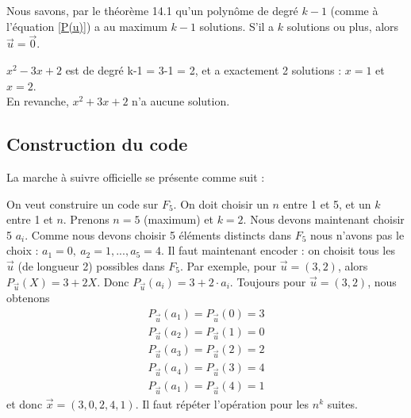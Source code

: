 \documentclass[11pt,a4paper]{article}
\renewcommand{\)}{\right)}
\renewcommand{\(}{\left(}
\begin{document}
Nous savons, par le théorème 14.1 qu'un polynôme de degré $k-1$ (comme à l'équation \eqref{P(u)}) a au maximum $k-1$ solutions. S'il a $k$ solutions ou plus, alors $\vec{u} = \vec{0}$.
\begin{exemple}
	$x^2 - 3x + 2$ est de degré k-1 = 3-1 = 2, et a exactement 2 solutions : $x= 1$ et $x=2$.\\
	En revanche, $x^2 + 3x + 2$ n'a aucune solution.
\end{exemple}


\subsection{Construction du code}
La marche à suivre officielle se présente comme suit :\\
\begin{exemple}
	 On veut construire un code sur $F_5$. On doit choisir un $n$ entre 1 et 5, et un $k$ entre 1 et $n$. Prenons $n=5$ (maximum) et $k = 2$. Nous devons maintenant choisir 5 $a_i$. Comme nous devons choisir 5 éléments distincts dans $F_5$ nous n'avons pas le choix : $a_1 = 0,\ a_2 = 1,...,a_5 = 4$. Il faut maintenant encoder : on choisit tous les $\vec{u}$ (de longueur 2) possibles dans $F_5$. Par exemple, pour $\vec{u} = (3,2)$, alors $P_{\vec{u}}(X) = 3+2X$. Donc $P_{\vec{u}}(a_i) = 3 + 2\cdot a_i$. Toujours pour $\vec{u} = (3,2)$, nous obtenons 
	\begin{align*}
		P_{\vec{u}}(a_1) = P_{\vec{u}}(0) = 3\\
		P_{\vec{u}}(a_2) = P_{\vec{u}}(1) = 0\\
		P_{\vec{u}}(a_3) = P_{\vec{u}}(2) = 2\\
		P_{\vec{u}}(a_4) = P_{\vec{u}}(3) = 4\\
		P_{\vec{u}}(a_1) = P_{\vec{u}}(4) = 1
	\end{align*}
	et donc $\vec{x} = (3,0,2,4,1)$. Il faut répéter l'opération pour les $n^k$ suites.
\end{exemple}
\end{document}
